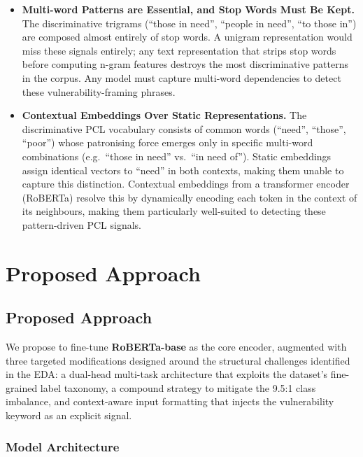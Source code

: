 \documentclass[11pt,a4paper]{article}
\begin{document}
\begin{itemize}[noitemsep]
    \item \textbf{Multi-word Patterns are Essential, and Stop Words Must Be Kept.} The discriminative trigrams (``those in need'', ``people in need'', ``to those in'') are composed almost entirely of stop words. A unigram representation would miss these signals entirely; any text representation that strips stop words before computing n-gram features destroys the most discriminative patterns in the corpus. Any model must capture multi-word dependencies to detect these vulnerability-framing phrases.

    \item \textbf{Contextual Embeddings Over Static Representations.} The discriminative PCL vocabulary consists of common words (``need'', ``those'', ``poor'') whose patronising force emerges only in specific multi-word combinations (e.g.\ ``those in need'' vs.\ ``in need of''). Static embeddings assign identical vectors to ``need'' in both contexts, making them unable to capture this distinction. Contextual embeddings from a transformer encoder (RoBERTa) resolve this by dynamically encoding each token in the context of its neighbours, making them particularly well-suited to detecting these pattern-driven PCL signals.
\end{itemize}

\newpage
\section{Proposed Approach}

\subsection{Proposed Approach}

We propose to fine-tune \textbf{RoBERTa-base} \cite{liu2019robertarobustlyoptimizedbert} as the core encoder, augmented with three targeted modifications designed around the structural challenges identified in the EDA: a dual-head multi-task architecture that exploits the dataset's fine-grained label taxonomy, a compound strategy to mitigate the 9.5:1 class imbalance, and context-aware input formatting that injects the vulnerability keyword as an explicit signal.

\subsubsection{Model Architecture}
\end{document}
